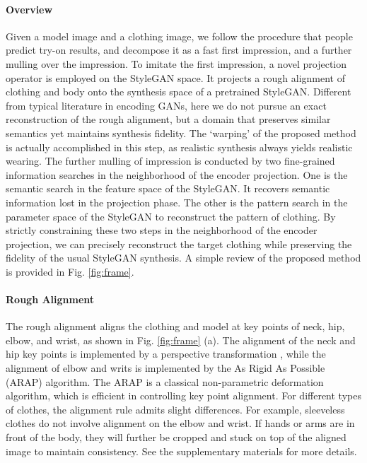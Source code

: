 \documentclass[10pt,twocolumn,letterpaper]{article}
\begin{document}
\paragraph{Overview} Given a model image and a clothing image, we follow the procedure that people predict try-on results, and decompose it as a fast first impression, and a further mulling over the impression. To imitate the first impression, a novel projection operator is employed on the StyleGAN space. It projects a rough alignment of clothing and body onto the synthesis space of a pretrained StyleGAN. Different from typical literature in encoding GANs, here we do not pursue an exact reconstruction of the rough alignment, but a domain that preserves similar semantics yet maintains synthesis fidelity. The `warping' of the proposed method is actually accomplished in this step, as realistic synthesis always yields realistic wearing. The further mulling of impression is conducted by two fine-grained information searches in the neighborhood of the encoder projection. One is the semantic search in the feature space of the StyleGAN. It recovers semantic information lost in the projection phase. The other is the pattern search in the parameter space of the StyleGAN to reconstruct the pattern of clothing. By strictly constraining these two steps in the neighborhood of the encoder projection, we can precisely reconstruct the target clothing while preserving the fidelity of the usual StyleGAN synthesis. A simple review of the proposed method is provided in Fig. \ref{fig:frame}.





\paragraph{Rough Alignment} The rough alignment aligns the clothing and model at key points of neck, hip, elbow, and wrist, as shown in Fig. \ref{fig:frame} (a). The alignment of the neck and hip key points is implemented by a perspective transformation \cite{mezirow1978perspective}, while the alignment of elbow and writs is implemented by the As Rigid As Possible (ARAP) \cite{alexa2000rigid,igarashi2005rigid,jacobson2011bounded} algorithm. The ARAP is a classical non-parametric deformation algorithm, which is efficient in controlling key point alignment. For different types of clothes, the alignment rule admits slight differences. For example, sleeveless clothes do not involve alignment on the elbow and wrist. If hands or arms are in front of the body, they will further be cropped and stuck on top of the aligned image to maintain consistency. See the supplementary materials for more details.
\end{document}
